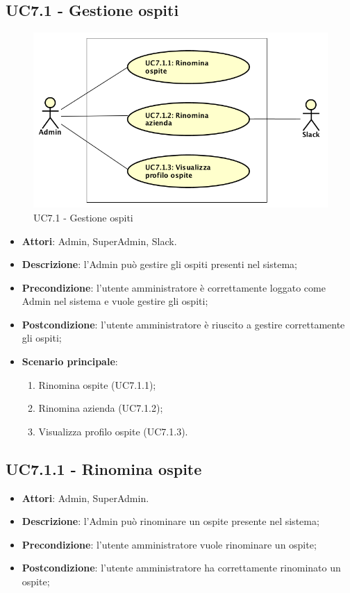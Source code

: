 \documentclass[../AnalisiDeiRequisiti.tex]{subfiles}
\begin{document}
\subsection{UC7.1 - Gestione ospiti} 
\label{sssec:UC7.1} 
\begin{figure}[!h]
	\centering
	\includegraphics[width=\textwidth]{UseCases/UC7_GestionePannelloAdmin/UC7_1_GestioneOspiti/UC7_1_GestioneOspiti.png}
	\caption{UC7.1 - Gestione ospiti}
\end{figure}
\begin{itemize} 
\item \textbf{Attori}: Admin, SuperAdmin, Slack.
\item \textbf{Descrizione}: l'Admin può gestire gli ospiti presenti nel sistema;
\item \textbf{Precondizione}: l'utente amministratore è correttamente loggato come Admin nel sistema e vuole gestire gli ospiti;
\item \textbf{Postcondizione}: l'utente amministratore è riuscito a gestire correttamente gli ospiti;
\item \textbf{Scenario principale}: \begin{enumerate}\item Rinomina ospite (UC7.1.1);\item Rinomina azienda (UC7.1.2);\item Visualizza profilo ospite (UC7.1.3). 
 \end{enumerate}
\end{itemize} 
\subsection{UC7.1.1 - Rinomina ospite} 
\label{sssec:UC7.1.1} 
\begin{itemize} 
\item \textbf{Attori}: Admin, SuperAdmin.
\item \textbf{Descrizione}: l'Admin può rinominare un ospite presente nel sistema;
\item \textbf{Precondizione}: l'utente amministratore vuole rinominare un ospite;
\item \textbf{Postcondizione}: l'utente amministratore ha correttamente rinominato un ospite;
\end{itemize} 
\end{document}
